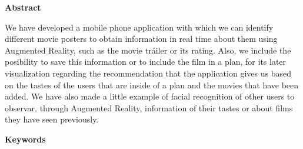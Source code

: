 
\newpage

\thispagestyle{empty}

\begin{center}

{\bf \Huge Abstract}

  \end{center}
\vspace{1cm}

We have developed a mobile phone application with which we can 
identify different movie posters to obtain information in real time about 
them using Augmented Reality, such as the movie tráiler or its rating. Also,
we include the posibility to save this information or to include the film in a plan,
for its later visualization regarding the recommendation that the application gives us based
on the tastes of the users that are inside of a plan and the movies that have been 
added. We have also made a little example of facial recognition of other users to observar,
through Augmented Reality, information of their tastes or about films they have seen previously.

\vspace{1cm}

\begin{center}

  {\bf \Large Keywords}
  
     \end{center}
  
     \vspace{0.5cm}
     
